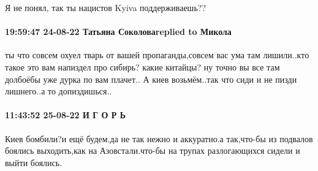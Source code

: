 Я не понял, так ты нацистов Kyiva поддерживаешь??

\paragraph{19:59:47 24-08-22 Татьяна Соколоваreplied to Микола}



ты что совсем охуел тварь от вашей пропаганды,совсем вас ума там лишили..кто
такое это вам напиздел про сибирь? какие китайцы? ну точно вы все там долбоёбы
уже дурка по вам плачет.. А киев возьмём..так что сиди и не пизди лишнего..а то
допиздишься..

\paragraph{11:43:52 25-08-22 И Г О Р Ь}

Киев бомбили?и ещё будем.да не так нежно и аккуратно.а так,что-бы из подвалов
боялись выходить,как на Азовстали.что-бы на трупах разлогающихся сидели и выйти
боялись.
